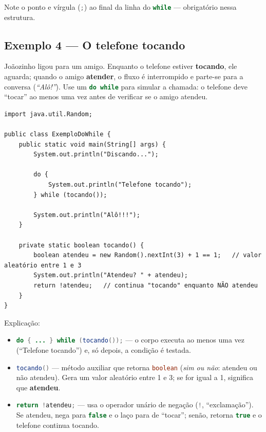 \documentclass[12pt,a4paper]{article}
\newcommand{\codigo}[1]{\lstinline[language=Java,basicstyle=\ttfamily\small]|#1|}
\begin{document}
Note o ponto e vírgula (\codigo{;}) ao final da linha do \codigo{while} ---
obrigatório nessa estrutura.

\subsection{Exemplo 4 --- O telefone tocando}

\begin{enunciado}
Joãozinho ligou para um amigo. Enquanto o telefone estiver \textbf{tocando}, ele
aguarda; quando o amigo \textbf{atender}, o fluxo é interrompido e parte-se para a
conversa (\emph{``Alô!''}). Use um \codigo{do while} para simular a chamada: o
telefone deve ``tocar'' ao menos uma vez antes de verificar se o amigo atendeu.
\end{enunciado}

\begin{solucao}
\begin{lstlisting}[caption={ExemploDoWhile.java}]
import java.util.Random;

public class ExemploDoWhile {
    public static void main(String[] args) {
        System.out.println("Discando...");

        do {
            System.out.println("Telefone tocando");
        } while (tocando());

        System.out.println("Alô!!!");
    }

    private static boolean tocando() {
        boolean atendeu = new Random().nextInt(3) + 1 == 1;   // valor aleatório entre 1 e 3
        System.out.println("Atendeu? " + atendeu);
        return !atendeu;   // continua "tocando" enquanto NÃO atendeu
    }
}
\end{lstlisting}
\end{solucao}

Explicação:
\begin{itemize}
  \item \codigo{do { ... } while (tocando());} --- o corpo executa ao menos
        uma vez (``Telefone tocando'') e, só depois, a condição é testada.
  \item \codigo{tocando()} --- método auxiliar que retorna \codigo{boolean}
        (\emph{sim ou não}: atendeu ou não atendeu). Gera um valor aleatório entre
        1 e 3; se for igual a 1, significa que \textbf{atendeu}.
  \item \codigo{return !atendeu;} --- usa o operador unário de negação
        (\codigo{!}, ``exclamação''). Se atendeu, nega para \codigo{false} e o
        laço para de ``tocar''; senão, retorna \codigo{true} e o telefone continua
        tocando.
\end{itemize}
\end{document}

